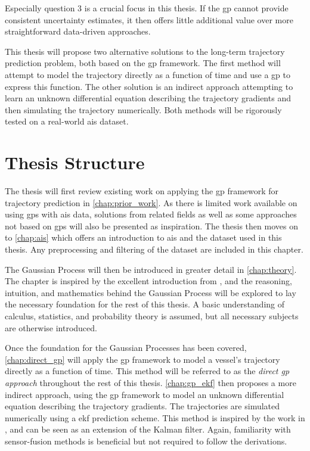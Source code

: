 Especially question 3 is a crucial focus in this thesis. If the \acrshort{gp} cannot provide consistent uncertainty estimates, it then offers little additional value over more straightforward data-driven approaches. 


This thesis will propose two alternative solutions to the long-term trajectory prediction problem, both based on the \acrshort{gp} framework. The first method will attempt to model the trajectory directly as a function of time and use a \acrshort{gp} to express this function. The other solution is an indirect approach attempting to learn an unknown differential equation describing the trajectory gradients and then simulating the trajectory numerically. Both methods will be rigorously tested on a real-world \acrshort{ais} dataset.

\section{Thesis Structure}
The thesis will first review existing work on applying the \acrshort{gp} framework for trajectory prediction in \cref{chap:prior_work}. As there is limited work available on using \acrshort{gp}s with \acrshort{ais} data, solutions from related fields as well as some approaches not based on \acrshort{gp}s will also be presented as inspiration. The thesis then moves on to \cref{chap:ais} which offers an introduction to \acrshort{ais} and the dataset used in this thesis. Any preprocessing and filtering of the dataset are included in this chapter.

The Gaussian Process will then be introduced in greater detail in \cref{chap:theory}. The chapter is inspired by the excellent introduction from \cite{rasmussen}, and the reasoning, intuition, and mathematics behind the Gaussian Process will be explored to lay the necessary foundation for the rest of this thesis. A basic understanding of calculus, statistics, and probability theory is assumed, but all necessary subjects are otherwise introduced.  

Once the foundation for the Gaussian Processes has been covered, \cref{chap:direct_gp} will apply the \acrshort{gp} framework to model a vessel's trajectory directly as a function of time. This method will be referred to as the \textit{direct \acrshort{gp} approach} throughout the rest of this thesis.
\cref{chap:gp_ekf} then proposes a more indirect approach, using the \acrshort{gp} framework to model an unknown differential equation describing the trajectory gradients. The trajectories are simulated numerically using a \acrshort{ekf} prediction scheme. This method is inspired by the work in \cite{pedestrian,gpekf}, and can be seen as an extension of the Kalman filter. Again, familiarity with sensor-fusion methods is beneficial but not required to follow the derivations.

